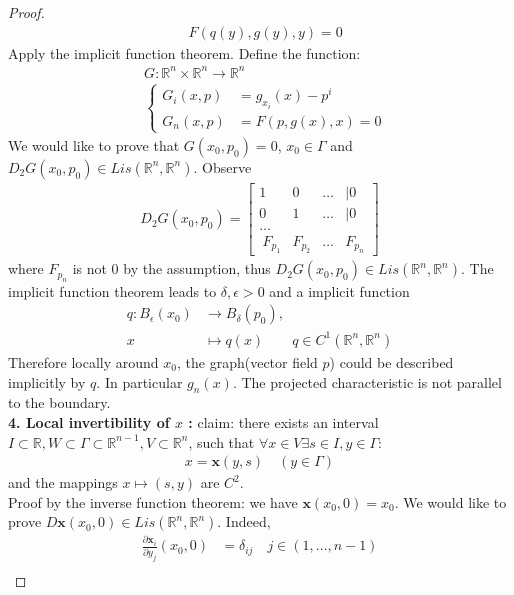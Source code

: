 \begin{proof}
\begin{align*}
	&F(q(y), g(y), y) = 0
\end{align*} 
Apply the implicit function theorem. Define the function:
\begin{align*}
	&G: \mathbb{R}^n \times \mathbb{R}^n \rightarrow \mathbb{R}^n \\
	&\left\{
	\begin{aligned}
		G_i(x, p) &= g_{x_i}(x) - p^i\\
		G_n(x, p) &= F(p, g(x), x) = 0 
	\end{aligned}
	\right.
\end{align*} 
We would like to prove that $G(x_0, p_0) = 0$, $x_0 \in \Gamma$ and $D_2 G(x_0, p_0) \in Lis(\mathbb{R}^n, \mathbb{R}^n)$. Observe
\begin{align*}
	D_2G(x_0, p_0 ) =
	\begin{bmatrix}
		1 & 0 & \dots &|0\\
		0 & 1 & \dots &|0\\
		\dots\\\
		F_{p_1} & F_{p_2} & \dots & F_{p_n} 
	\end{bmatrix}
\end{align*}
where $F_{p_n}$ is not $0$ by the assumption, thus $D_2G(x_0, p_0) \in Lis(\mathbb{R}^n, \mathbb{R}^n)$.   The implicit function theorem leads to $\delta, \epsilon > 0$ and a implicit function 
\begin{align*}
	q: B_{\epsilon}(x_0) &\rightarrow B_\delta(p_0),\quad \\
	x &\mapsto q(x)  \qquad q \in C^1(\mathbb{R}^n, \mathbb{R}^n)
\end{align*}
Therefore locally around $x_0$, the graph(vector field $p$) could be described implicitly by $q$. In particular $g_n(x)$. The projected characteristic is not parallel to the boundary. \\
\textbf{4. Local invertibility of $x$ :} claim: there exists an interval $I \subset \mathbb{R}, W \subset \Gamma \subset  \mathbb{R}^{n-1}, V \subset \mathbb{R}^n$, such that $\forall x \in V \exists s \in I, y \in \Gamma:$
\begin{align*}
	x = \textbf{x}(y, s) \quad (y \in \Gamma) 
\end{align*}
and the mappings $x \mapsto (s, y)$ are $C^2$. \\
Proof by the inverse function theorem: we have $\textbf{x}(x_0,0) = x_0$. We would like to prove $D \textbf{x}(x_0, 0) \in Lis(\mathbb{R}^n, \mathbb{R}^n)$. Indeed,
\begin{align*}
	\frac{\partial \textbf{x}_i }{\partial y_j}(x_0, 0) &= \delta_{ij} \quad j\in (1, \dots, n-1) \\

\end{align*}
\end{proof}
